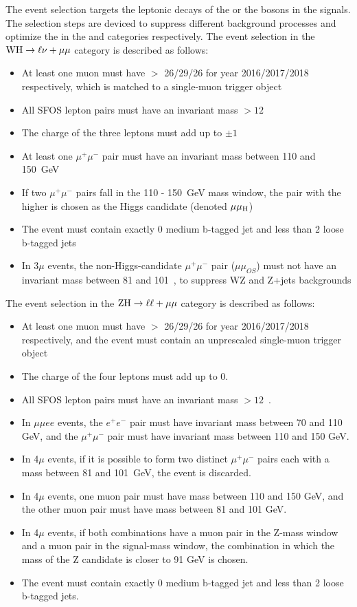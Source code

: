 The event selection targets the leptonic decays of the \PW or the \PZ bosons in the \VH signals.
The selection steps are deviced to suppress different background processes 
and optimize the \SoB in the \WH and \ZH categories respectively. 
The event selection in the $\mathrm{W}\mathrm{H} \to \ell\nu+\mu\mu$ category is described as follows:
\begin{itemize}
	\item At least one muon must have \pt $>$ 26\GeV /29\GeV /26\GeV 
	      for year 2016/2017/2018 respectively, which is matched to a
              single-muon trigger object
	\item All SFOS lepton pairs must have an invariant mass $> 12$~\GeV
	\item The charge of the three leptons must add up to $\pm 1$
	\item At least one $\mu^{+}\mu^{-}$ pair must have an invariant mass between 110
	      and 150~GeV
	\item If two $\mu^{+}\mu^{-}$ pairs fall in the 110 - 150~GeV mass window, the pair
	      with the higher \pt is chosen as the Higgs candidate (denoted $\mu\mu_{\mathrm{H}}$)
	\item The event must contain exactly 0 medium b-tagged jet and less than 2 loose b-tagged jets
	\item In 3$\mu$ events, the non-Higgs-candidate $\mu^{+}\mu^{-}$ pair ($\mu\mu_{OS}$) must
	      not have an invariant mass between 81 and 101~\GeV, to suppress WZ and Z+jets backgrounds
\end{itemize}
The event selection in the $\mathrm{Z}\mathrm{H} \to \ell\ell + \mu\mu$ category is described as follows:
\begin{itemize}
	\item At least one muon must have \pt $>$ 26\GeV /29\GeV /26\GeV 
	      for year 2016/2017/2018 respectively, and the event must
	      contain an unprescaled single-muon trigger object
	\item The charge of the four leptons must add up to 0.
	\item All SFOS lepton pairs must have an invariant mass $> 12$~\GeV.
	\item In $\mu\mu ee$ events, the $e^{+}e^{-}$ pair must have invariant mass between 70 and 110 GeV, and the $\mu^{+}\mu^{-}$ pair must have invariant mass between 110 and 150 GeV.
	\item In 4$\mu$ events, if it is possible to form two distinct $\mu^{+}\mu^{-}$ pairs
          each with a mass between 81 and 101~GeV, the event is discarded.
	\item In 4$\mu$ events, one muon pair must have mass between 110 and 150 GeV, and the other muon pair must have mass between 81 and 101 GeV.
	\item In 4$\mu$ events, if both combinations have a muon pair in the Z-mass window and a muon pair in the signal-mass window, the combination in which the mass of the Z candidate is closer to 91 GeV is chosen. 
	\item The event must contain exactly 0 medium b-tagged jet and less than 2 loose b-tagged jets.    
\end{itemize}
